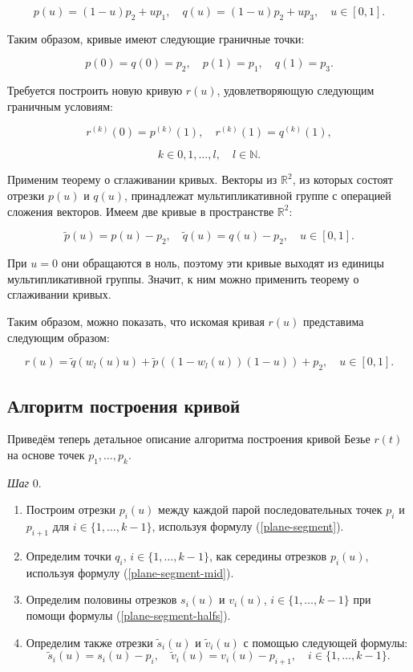 $$
p(u)=(1-u)p_2+up_1, \quad q(u)=(1-u)p_2+up_3, \quad u \in [0,1].
$$

Таким образом, кривые имеют следующие граничные точки:

$$
p(0)=q(0)=p_2, \quad p(1)=p_1, \quad q(1)=p_3.
$$

Требуется построить новую кривую $r(u)$, удовлетворяющую следующим граничным условиям:

$$
r^{(k)}(0)=p^{(k)}(1), \quad r^{(k)}(1)=q^{(k)}(1),
$$

$$
k \in {0,1,\dots,l}, \quad l \in \mathbb{N}.
$$

Применим теорему о сглаживании кривых. Векторы из $\mathbb{R}^2$, из которых состоят отрезки $p(u)$ и $q(u)$,
принадлежат мультипликативной группе с операцией сложения векторов. Имеем две кривые в пространстве $\mathbb{R}^2$:

$$
\tilde p(u)=p(u)-p_2, \quad \tilde q(u)=q(u)-p_2, \quad u \in [0,1].
$$

При $u=0$ они обращаются в ноль, поэтому эти кривые выходят из единицы мультипликативной группы. Значит, к ним можно
применить теорему о сглаживании кривых.

Таким образом, можно показать, что искомая кривая $r(u)$ представима следующим образом:

$$
r(u)=\tilde q(w_l(u)u)+\tilde p((1-w_l(u))(1-u))+p_2, \quad u \in [0,1].
$$

\subsection*{Алгоритм построения кривой}

Приведём теперь детальное описание алгоритма построения кривой Безье $r(t)$ на основе точек $p_1,\dots,p_k$.

\bigskip
\textit{Шаг} 0.

\begin{enumerate}
\item Построим отрезки $p_i(u)$ между каждой парой последовательных точек $p_i$ и $p_{i+1}$ для
$i \in \{1,\dots,k-1\}$, используя формулу (\ref{plane-segment}).
\item Определим точки $q_i$, $i \in \{1,\dots,k-1\}$, как середины отрезков $p_i(u)$, используя формулу
(\ref{plane-segment-mid}).
\item Определим половины отрезков $s_i(u)$ и $v_i(u)$, $i \in \{1,\dots,k-1\}$ при помощи формулы
(\ref{plane-segment-halfs}).
\item Определим также отрезки $\tilde s_i(u)$ и $\tilde v_i(u)$ с помощью следующей формулы:
$$
\tilde s_i(u)=s_i(u)-p_i, \quad \tilde v_i(u)=v_i(u)-p_{i+1}, \quad i \in \{1,\dots,k-1\}.
$$
\end{enumerate}

